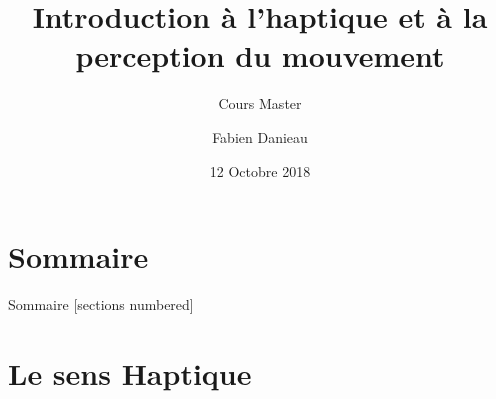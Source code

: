\documentclass[compress, noflama]{beamer}
\title{Introduction à l'haptique et à la perception du mouvement}
\subtitle{Cours Master}
\date{12 Octobre 2018}%
\author{Fabien Danieau}
\institute{Technicolor - Immersive Media Lab\\ \href{mailto:fabien.danieau@technicolor.com}{fabien.danieau@technicolor.com}}
\begin{document}

\maketitle


\section*{Sommaire}
\begin{frame}{Sommaire}
	[sections numbered]
	\tableofcontents[hideallsubsections]
\end{frame}


\section{Le sens Haptique}
\end{document}
